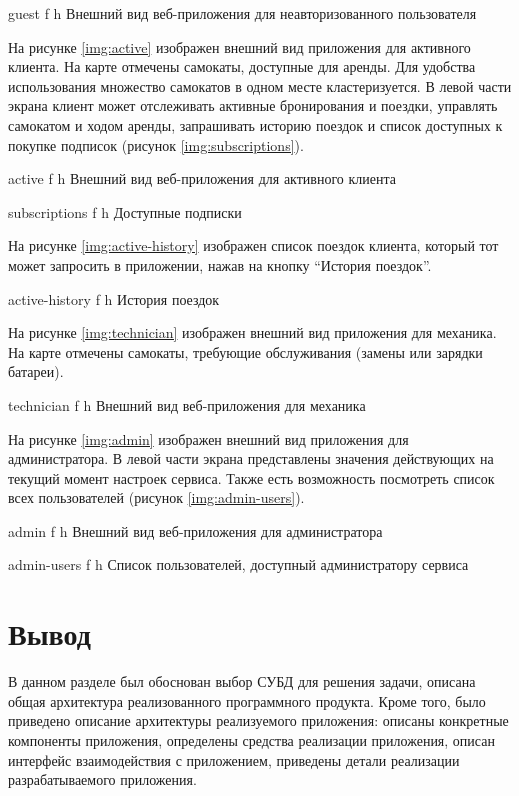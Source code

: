 {guest}
{f}
{h}
{\textwidth}
{Внешний вид веб-приложения для неавторизованного пользователя}

На рисунке \ref{img:active} изображен внешний вид приложения для активного клиента. На карте отмечены самокаты, доступные для аренды. Для удобства использования множество самокатов в одном месте кластеризуется. В левой части экрана клиент может отслеживать активные бронирования и поездки, управлять самокатом и ходом аренды, запрашивать историю поездок и список доступных к покупке подписок (рисунок \ref{img:subscriptions}).

{active}
{f}
{h}
{\textwidth}
{Внешний вид веб-приложения для активного клиента}

{subscriptions}
{f}
{h}
{\textwidth}
{Доступные подписки}

На рисунке \ref{img:active-history} изображен список поездок клиента, который тот может запросить в приложении, нажав на кнопку \enquote{История поездок}.

{active-history}
{f}
{h}
{\textwidth}
{История поездок}

На рисунке \ref{img:technician} изображен внешний вид приложения для механика. На карте отмечены самокаты, требующие обслуживания (замены или зарядки батареи).

{technician}
{f}
{h}
{\textwidth}
{Внешний вид веб-приложения для механика}

На рисунке \ref{img:admin} изображен внешний вид приложения для администратора. В левой части экрана представлены значения действующих на текущий момент настроек сервиса. Также есть возможность посмотреть список всех пользователей (рисунок \ref{img:admin-users}).

{admin}
{f}
{h}
{\textwidth}
{Внешний вид веб-приложения для администратора}

{admin-users}
{f}
{h}
{\textwidth}
{Список пользователей, доступный администратору сервиса}

\section*{Вывод}

В данном разделе был обоснован выбор  СУБД для решения задачи, описана общая архитектура реализованного программного продукта. Кроме того, было приведено описание архитектуры реализуемого приложения: описаны конкретные компоненты приложения, определены средства реализации приложения, описан интерфейс взаимодействия с приложением, приведены детали реализации разрабатываемого приложения.